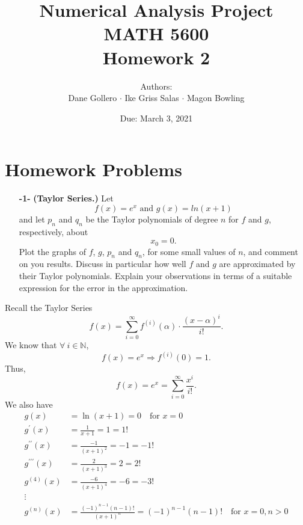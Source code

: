 \documentclass[11pt]{article}
\theoremstyle{definition}
\newcommand{\1}[1]{\mathbf{1} \left \{ #1 \right \}}
\begin{document}
\title{Numerical Analysis Project \\ MATH 5600 \\ Homework 2}
\date{Due: March 3, 2021}
\author{Authors: \\ Dane Gollero $\cdot$ Ike Griss Salas $\cdot$ Magon Bowling}

\maketitle

\tableofcontents

\section{Homework Problems}

\begin{itemize}
    \item[{\textbf{-1-}}] \textbf{(Taylor Series.)}  Let
    \begin{equation}
        f(x)=e^x \text{ and } g(x)=ln(x+1)
    \end{equation}
    and let $p_n$ and $q_n$ be the Taylor polynomials of degree $n$ for $f$ and $g$, respectively, about
    \begin{equation}
        x_0 = 0.
    \end{equation}
    Plot the graphs of $f$, $g$, $p_n$ and $q_n$, for some small values of $n$, and comment on you results.  Discuss in particular how well $f$ and $g$ are approximated by their Taylor polynomials.  Explain your observations in terms of a suitable expression for the error in the approximation.
\end{itemize}
Recall the Taylor Series
\[f(x) = \sum_{i=0}^{\infty} f^{(i)} (\alpha) \cdot \frac{(x-\alpha)^i}{i!}.\]
We know that \(\forall \ i \in \mathbb{N}\),
\[f(x) = e^x \Rightarrow f^{(i)}(0) = 1.\]
Thus,
\[f(x) = e^x = \sum_{i=0}^{\infty} \frac{x^i}{i!}.\]
We also have
\begin{equation*}
    \begin{split}
        g(x) &= \ln (x+1) = 0 \quad \text{for } x = 0 \\
        g^{\prime}(x) &= \frac{1}{x+1} = 1 = 1! \\
        g^{\prime\prime}(x) &= \frac{-1}{(x+1)^2} = -1 = -1! \\
        g^{\prime\prime\prime}(x) &= \frac{2}{(x+1)^3} = 2 = 2! \\
        g^{(4)}(x) &= \frac{-6}{(x+1)^4} = -6 = -3! \\
        \vdots \\
        g^{(n)} (x) &= \frac{(-1)^{n-1} (n-1)!}{(x+1)^n} = (-1)^{n-1} (n-1)! \quad \text{for } x=0, n>0
    \end{split}
\end{equation*}
\end{document}
